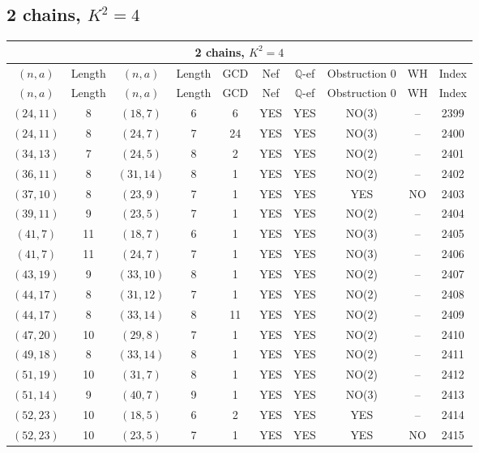 \subsection{2 chains, $K^2 = 4$}
\begin{longtable}{|c|c|c|c|c|c|c|c|c|c|}
\hline
\multicolumn{10}{|c|}{2 chains, $K^2 = 4$}\\
\hline
$(n,a)$ & Length & $(n,a)$ & Length & GCD & Nef & $\mathbb Q$-ef & Obstruction 0 & WH & Index\\
\hline
\endfirsthead

\hline
$(n,a)$ & Length & $(n,a)$ & Length & GCD & Nef & $\mathbb Q$-ef & Obstruction 0 & WH & Index\\
\hline
\endhead
\hline
\endfoot

$(24, 11)$ & 8 & $(18, 7)$ & 6 & 6 & YES & YES & NO(3) & -- & 2399\\
$(24, 11)$ & 8 & $(24, 7)$ & 7 & 24 & YES & YES & NO(3) & -- & 2400\\
$(34, 13)$ & 7 & $(24, 5)$ & 8 & 2 & YES & YES & NO(2) & -- & 2401\\
$(36, 11)$ & 8 & $(31, 14)$ & 8 & 1 & YES & YES & NO(2) & -- & 2402\\
$(37, 10)$ & 8 & $(23, 9)$ & 7 & 1 & YES & YES & YES & NO & 2403\\
$(39, 11)$ & 9 & $(23, 5)$ & 7 & 1 & YES & YES & NO(2) & -- & 2404\\
$(41, 7)$ & 11 & $(18, 7)$ & 6 & 1 & YES & YES & NO(3) & -- & 2405\\
$(41, 7)$ & 11 & $(24, 7)$ & 7 & 1 & YES & YES & NO(3) & -- & 2406\\
$(43, 19)$ & 9 & $(33, 10)$ & 8 & 1 & YES & YES & NO(2) & -- & 2407\\
$(44, 17)$ & 8 & $(31, 12)$ & 7 & 1 & YES & YES & NO(2) & -- & 2408\\
$(44, 17)$ & 8 & $(33, 14)$ & 8 & 11 & YES & YES & NO(2) & -- & 2409\\
$(47, 20)$ & 10 & $(29, 8)$ & 7 & 1 & YES & YES & NO(2) & -- & 2410\\
$(49, 18)$ & 8 & $(33, 14)$ & 8 & 1 & YES & YES & NO(2) & -- & 2411\\
$(51, 19)$ & 10 & $(31, 7)$ & 8 & 1 & YES & YES & NO(2) & -- & 2412\\
$(51, 14)$ & 9 & $(40, 7)$ & 9 & 1 & YES & YES & NO(3) & -- & 2413\\
$(52, 23)$ & 10 & $(18, 5)$ & 6 & 2 & YES & YES & YES & -- & 2414\\
$(52, 23)$ & 10 & $(23, 5)$ & 7 & 1 & YES & YES & YES & NO & 2415\\

\end{longtable}
